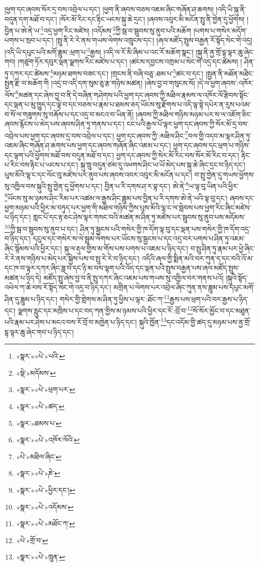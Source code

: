 །ཕྱག་དང་ཞབས་སོར་དྲ་བས་འབྲེལ་པ་དང་། །ཕྱག་ནི་ཞབས་བཅས་འཇམ་ཞིང་གཞོན་ཤ་ཆགས། །འདི་ཡི་སྐུ་ནི་བདུན་དག་མཐོ་བ་དང་། །སོར་མོ་རིང་དང་རྟིང་ཡངས་སྐུ་ཆེ་དྲང་། །ཞབས་འབུར་མི་མངོན་སྤུ་ནི་གྱེན་དུ་ཕྱོགས། །བྱིན་པ་ཨེ་ནེ་ཡ་\footnote{«སྣར་»«པེ་»ཡའི་}འདྲ་ཕྱག་རིང་མཛེས། །འདོམས་\footnote{«སྡེ་»མདོམས་}ཀྱི་སྦ་བ་སྦུབས་སུ་ནུབ་པའི་མཆོག །པགས་པ་གསེར་མདོག་པགས་པ་སྲབ་པ་དང་། །སྤུ་ནི་རེ་རེ་ནས་གཡས་ལེགས་འཁྲུངས་དང་། །ཞལ་མཛོད་སྤུས་བརྒྱན་རོ་སྟོད་སེང་གེ་འདྲ། །འདི་ཡི་དཔུང་པའི་མགོ་ཟླུམ་:ཕྲག་པ་\footnote{«སྣར་»«པེ་»ཕྲག་པར་}རྒྱས། །འདི་ལ་རོ་མི་ཞིམ་པ་འང་རོ་མཆོག་སྣང་། །སྐུ་ནི་ནྱ་གྲོ་དྷ་ལྟར་ཆུ་ཞེང་གབ། །གཙུག་ཏོར་དབུར་ལྡན་ལྗགས་རིང་མཛེས་པ་དང་། །ཚངས་དབྱངས་འགྲམ་པ་སེང་གེ་འདྲ་དང་ཚེམས། །
ཤིན་ཏུ་དཀར་དང་ཚེམས་\footnote{«སྣར་»«པེ་»ཚད་}མཉམ་ཐགས་བཟང་དང་། །གྲངས་ནི་བཞི་བཅུ་:ཐམ་པ་\footnote{«སྣར་»ཐམས་པ་}ཚང་བ་དང་། །སྤྱན་ནི་མཐོན་མཐིང་སྤྱན་རྫི་བ་མཆོག་གི །འདྲ་བ་འདི་དག་སུམ་ཅུ་རྩ་གཉིས་མཚན། །ཞེས་བྱ་བ་གསུངས་སོ། །དེ་ལ་ཕྱག་ཞབས་:འཁོར་ལོས་\footnote{«སྣར་»«པེ་»འཁོར་ལོའི་}མཚན་དང་ཞེས་བྱ་བ་ནི་དེ་བཞིན་གཤེགས་པའི་ཕྱག་དང་ཞབས་ཀྱི་མཐིལ་རྣམས་ལ་འཁོར་ལོ་རྩིབས་སྟོང་དང་ལྡན་པ་མུ་ཁྱུད་དང་ལྟེ་བ་དང་བཅས་པ་རྣམ་པ་ཐམས་ཅད་ཡོངས་སུ་རྫོགས་པ་འདི་ལྟ་སྟེ་དཔེར་ན་རུས་པའམ་བ་སོ་ལ་གཟུགས་སུ་བརྐོས་པ་དང་འདྲ་བ་མངའ་བ་ཡིན་ནོ། །ཞབས་ཀྱི་མཐིལ་གཉིས་མཉམ་པར་ས་ལ་འཇོག་ཅིང་ཞབས་རྙོངས་པ་མེད་པས་ཞབས་ཤིན་ཏུ་གནས་པ་དང་། ངང་པའི་རྒྱལ་པོ་ལྟར་ཕྱག་དང་ཞབས་ཀྱི་སོར་མོ་དྲ་བས་འབྲེལ་པས་ཕྱག་དང་ཞབས་དྲ་བས་འབྲེལ་པ་དང་། ཕྱག་དང་ཞབས་ཀྱི་:མཐིལ་ཤིང་\footnote{«པེ་»མཐིལ་ཞིང་}བལ་གྱི་འདབ་མ་ལྟར་ཤིན་ཏུ་འཇམ་ཞིང་གཞོན་ཤ་ཆགས་པས་ཕྱག་དང་ཞབས་གཞོན་ཞིང་འཇམ་པ་དང་། ཕྱག་དང་ཞབས་དང་ཕྲག་པ་གཉིས་དང་ལྟག་པའི་ཕྱོགས་མཐོ་བས་བདུན་མཐོ་བ་དང་། ཕྱག་དང་ཞབས་ཀྱི་སེར་མོ་རིང་བས་སོར་མོ་རིང་བ་དང་། རྟིང་པ་རིང་བས་རྟིང་པ་ཡངས་པ་དང་། སྐུ་ཁྲུ་བདུན་ཙམ་དུ་འཕགས་ཤིང་ཡ་ཡོ་མེད་པས་སྐུ་ཆེ་ཞིང་དྲང་བ་ཉིད་དང་། པུས་མོའི་ལྷ་ང་དང་ལོང་བུ་མཛེས་པར་ནུབ་པས་ཞབས་འབར་འབུར་མི་མངོན་པ་དང་། བ་སྤུ་གྱེན་དུ་གཡས་ཕྱོགས་སུ་འཁྱིལ་བས་སྐུའི་སྤུ་གྱེན་དུ་ཕྱོགས་པ་དང་། བྱིན་པ་རི་དགས་ཤ་ར་བྷ་དང་། ཨེ་ནེ་\footnote{«སྣར་»«པེ་»ཎེ་}ཡ་ལྟ་བུ་ཡིན་པའི་ཕྱིར་\footnote{«སྣར་»«པེ་»ཕྱིར་དང་། }ཡོངས་སུ་མ་ཉམས་ཤིང་རིམ་པར་འཚམ་ལ་རྒྱས་ཤིང་ཟླུམ་པས་བྱིན་པ་རི་དགས་ཨེ་ནེ་ཡའི་ལྟ་བུ་དང་། ཞབས་དང་ཕྱག་མཉམ་པའི་ཕྱིར་མ་བཏུད་པར་ཕྱག་གི་མཐིལ་གཉིས་ཀྱིས་པུས་མོའི་ལྷ་ང་ལ་སླེབས་པས་ཕྱག་རིང་ཞིང་མཛེས་པ་ཉིད་དང་། གླང་པོ་དང་རྟ་ཅང་ཤེས་ལྟར་གསང་བའི་མཚན་མ་ཤིན་ཏུ་མཛེས་པར་སྦུབས་སུ་ནུབ་པས་མདོམས་\footnote{«སྣར་»«པེ་»འདོམས་}ཀྱི་སྦ་བ་སྦུབས་སུ་ནུབ་པ་དང་། ཤིན་ཏུ་སྦྱངས་པའི་གསེར་གྱི་ཁ་དོག་ལྟ་བུ་དང་ལྡན་པས་གསེར་གྱི་ཁ་དོག་འདྲ་བ་ཉིད་དང་། དངུལ་དང་གསེར་ས་ལེ་སྦྲམ་ལེགས་པར་ཡོངས་སུ་སྦྱངས་པ་དང་འདྲ་བར་པགས་པ་ཤིན་ཏུ་འཇམ་ཞིང་སྙོམས་པའི་ཕྱིར་དང་། སྐུ་ལ་རྡུལ་གྱིས་མ་གོས་པས་པགས་པ་འཇམ་པ་ཉིད་དང་། བ་སྤུ་ཤིན་ཏུ་རྣམ་པར་ཕྱེ་ཞིང་རེ་རེ་ནས་གཉིས་པ་མེད་པར་སྐྱེས་པས་བ་སྤུ་རེ་རེ་བ་ཉིད་དང་། འདིའི་ཞལ་གྱི་སྨིན་མའི་བར་ཀུན་ད་དང་བའི་འོ་མ་དང་ཁ་བ་ལྟར་དཀར་ཞིང་ཟླ་བ་དང་ཉི་མ་བས་ལྷག་པའི་འོད་དང་ལྡན་པའི་སྤུས་བརྒྱན་པས་ཞལ་མཛོད་སྤུས་མཚན་པ་ཉིད་དེ། མཛོད་སྤུ་ཞེས་བྱ་བ་ནི་སྤུ་དཀར་ཞིང་འཇམ་པས་གཡས་སུ་འཁྱིལ་བར་གནས་པའོ། །སྐུའི་སྟོད་འཕེལ་ཀ་ཆེ་བས་རོ་སྟོད་སེང་གེ་འདྲ་བ་ཉིད་དང་། མགྲིན་པ་ལེགས་པར་འབྲེལ་ཞིང་ཀུན་ནས་ཟླུམ་པས་དཔུང་མགོ་ཤིན་དུ་ཟླུམ་པ་ཉིད་དང་། གསེར་གྱི་གླེགས་མ་ཤིན་ཏུ་ཕྱིས་པ་ལྟར་:ཐོང་ཀ་\footnote{«སྣར་»«པེ་»མཐོང་ཀ་}རྒྱས་པས་ཕྲག་པའི་བར་རྒྱས་པ་ཉིད་དང་། ལྗགས་རླུང་དང་མཁྲིས་པ་དང་བད་ཀན་གྱིས་མ་ཉམས་པའི་ཕྱིར་དང་རོ་:བྲོ་བ་\footnote{«པེ་»གྲོ་བ་}སོ་སོར་མྱོང་བ་དང་མཐུན་པའི་རྣམ་པར་ཤེས་པ་མངའ་བས་རོ་བྲོ་བ་མཁྱེན་པ་ཉིད་དང་། སྐུའི་ཁྱོན་\footnote{«སྣར་»«པེ་»ཁྲུན་}དང་འདོམ་གྱི་ཚད་དུ་མཉམ་པས་ནྱ་གྲོ་དྷ་ལྟར་ཆུ་ཞེང་གབ་པ་ཉིད་དང་། 